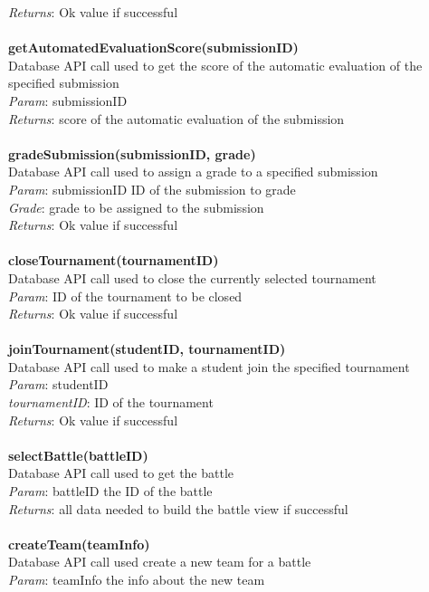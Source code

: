 \documentclass{article}
\begin{document}
\textit{Returns}: Ok value if successful\\
\\
\textbf{getAutomatedEvaluationScore(submissionID)}\\
Database API call used to get the score of the automatic evaluation of the specified submission\\
\textit{Param}: submissionID\\
\textit{Returns}: score of the automatic evaluation of the submission\\
\\
\textbf{gradeSubmission(submissionID, grade)}\\
Database API call used to assign a grade to a specified submission\\
\textit{Param}: submissionID ID of the submission to grade\\
\textit{Grade}: grade to be assigned to the submission\\
\textit{Returns}: Ok value if successful\\
\\
\textbf{closeTournament(tournamentID)}\\
Database API call used to close the currently selected tournament\\
\textit{Param}: ID of the tournament to be closed\\
\textit{Returns}: Ok value if successful\\
\\
\textbf{joinTournament(studentID, tournamentID)}\\
Database API call used to make a student join the specified tournament\\
\textit{Param}: studentID\\
\textit{tournamentID}: ID of the tournament\\
\textit{Returns}: Ok value if successful\\
\\
\textbf{selectBattle(battleID)}\\
Database API call used to get the battle\\
\textit{Param}: battleID the ID of the battle\\
\textit{Returns}: all data needed to build the battle view if successful\\
\\
\textbf{createTeam(teamInfo)}\\
Database API call used create a new team for a battle\\
\textit{Param}: teamInfo the info about the new team\\
\end{document}
